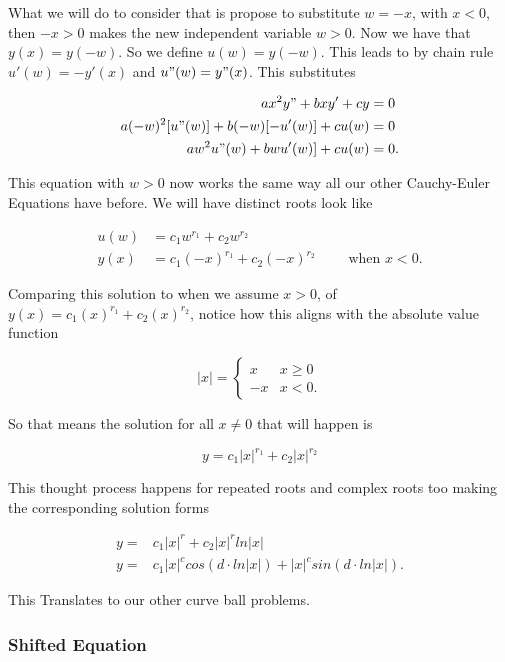 \documentclass[12pt]{article}
\begin{document}
What we will do to consider that is propose to substitute $w=-x$, with $x<0$, then $-x>0$ makes the new independent variable $w>0$. Now we have that $y(x)=y(-w)$. So we define $u(w)=y(-w)$. This leads to by chain rule $u'(w)=-y'(x)$ and $u"(w)=y"(x)$. This substitutes

\begin{align*}
    ax^2y"+bxy'+cy &= 0 \\
    a(-w)^2[u"(w)]+b(-w)[-u'(w)]+c u(w) &= 0 \\
    aw^2u"(w)+bwu'(w)]+cu(w) &= 0.
\end{align*}

This equation with $w>0$ now works the same way all our other Cauchy-Euler Equations have before. We will have distinct roots look like

\begin{align*}
    u(w) &= c_1w^{r_1}+c_2w^{r_2} \\
    y(x) &= c_1(-x)^{r_1}+c_2(-x)^{r_2} \qquad \text{ when } x<0.
\end{align*}

Comparing this solution to when we assume $x>0$, of $y(x) = c_1(x)^{r_1}+c_2(x)^{r_2}$, notice how this aligns with the absolute value function

\begin{equation*}
    |x|=\left\{
        \begin{array}{ll}
            x &  x \geq 0  \\
            -x & x < 0.
        \end{array}
    \right.
\end{equation*}

So that means the solution for all $x\neq0$ that will happen is

\begin{equation*}
    y=c_1|x|^{r_1}+c_2|x|^{r_2}
\end{equation*}

This thought process happens for repeated roots and complex roots too making the corresponding solution forms

\begin{align*}
    y=&c_1|x|^{r}+c_2|x|^{r}ln|x| \\
    y=&c_1|x|^{c}cos(d\cdot ln|x|)+|x|^{c}sin(d\cdot ln|x|).
\end{align*}

This Translates to our other curve ball problems. 

\subsubsection{Shifted Equation}
\end{document}

